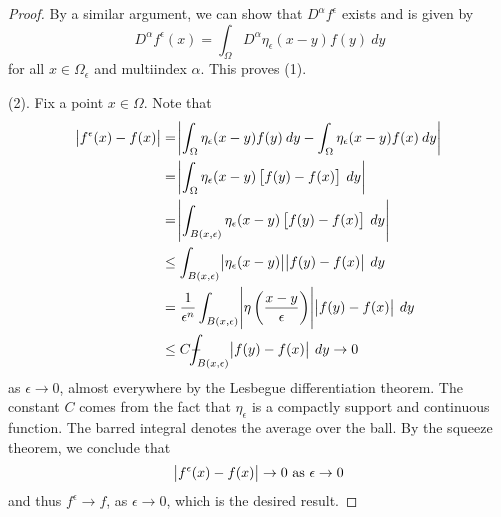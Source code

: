 \documentclass[10pt]{article}
\begin{document}
\begin{proof}
	By a similar argument, we can show that $D^\alpha f^\epsilon$ exists and is given by 
	\begin{equation*}
		\displaystyle D^\alpha f^\epsilon(x) = \int_{\Omega}{D^\alpha \eta_\epsilon (x-y) f(y) \: dy}
	\end{equation*}
	for all $x \in \Omega_\epsilon$ and multiindex $\alpha$. This proves (1). 
	
	(2). Fix a point $x \in \Omega$. Note that 
	\begin{align*}
		\displaystyle \abs{f^\epsilon(x) - f(x)} &= \abs{\int_{\Omega}{\eta_\epsilon(x-y)f(y) \: dy} - \int_{\Omega}{\eta_\epsilon(x-y)f(x) \: dy}} \\
		&= \abs{ \int_{\Omega}{\eta_\epsilon(x-y)\left[ f(y) - f(x) \right] \: dy} } \\
		&= \abs{\int_{B(x,\epsilon)}{\eta_\epsilon(x-y)\left[ f(y) - f(x) \right] \: dy}} \\
		&\leq \int_{B(x,\epsilon)}{\abs{\eta_\epsilon(x-y)}\abs{f(y) - f(x)} \: dy} \\
		&= \frac{1}{\epsilon^n}\int_{B(x,\epsilon)}{\abs{\eta\left(\frac{x-y}{\epsilon}\right)}\abs{f(y) - f(x)} \: dy} \\
		&\leq C\dashint_{B(x,\epsilon)}{\abs{f(y) - f(x)} \: dy} \to 0
	\end{align*}
	as $\epsilon \to 0$, almost everywhere by the Lesbegue differentiation theorem. The constant $C$ comes from the fact that $\eta_\epsilon$ is a compactly support and continuous function. The barred integral denotes the average over the ball. By the squeeze theorem, we conclude that 
	\begin{equation*}
		\displaystyle \abs{f^\epsilon(x) - f(x)} \to 0 \textrm{ as } \epsilon \to 0
	\end{equation*}
	and thus $f^\epsilon \to f$, as $\epsilon \to 0$, which is the desired result. 
	

\end{proof}
\end{document}
